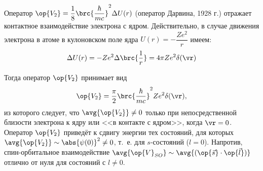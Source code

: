 Оператор $\op{V_2} = \dfrac{1}{8} \brc{\dfrac{\hbar}{mc}}^2\Delta U(r)$ (оператор Дарвина, 1928 г.) отражает контактное взаимодействие электрона с ядром. Действительно, в случае движения электрона в атоме в кулоновском поле ядра $U(r)  = -\dfrac{Ze^2}{r}$ имеем:
$$
\Delta U(r) = -Ze^2 \Delta \brc{\frac{1}{r}} = 4 \pi Ze^2 \delta(\vr)
$$

Тогда оператор $\op{V_2}$ принимает вид
$$
\op{V_2} = \frac{\pi}{2} \brc{\frac{\hbar}{mc}}^2 Ze^2 \delta(\vr),
$$
из которого следует, что $\avg{\op{V_2}} \neq 0$ только при непосредственной близости электрона к ядру или <<в контакте с ядром>>, когда $\vr = 0$. Оператор $\op{V_2}$ приведёт к сдвигу энергии тех состояний, для которых $\avg{\op{V_2}} \sim \abs{\psi(0)}^2 \neq 0$, т.~е. для $s$-состояний ($l=0$). Напротив, спин-орбитальное взаимодействие $\avg{\op{V}_{SO}} \sim \avg{(\op{\vec{s}} \cdot \op{\vec{l}})}$ отлично от нуля для состояний с $l \neq 0$.
